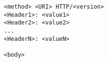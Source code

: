 
\begin{lstlisting}[language=none]
<method> <URI> HTTP/<version>
<Header1>: <value1>
<Header2>: <value2>
...
<HeaderN>: <valueN>

<body>
\end{lstlisting}
